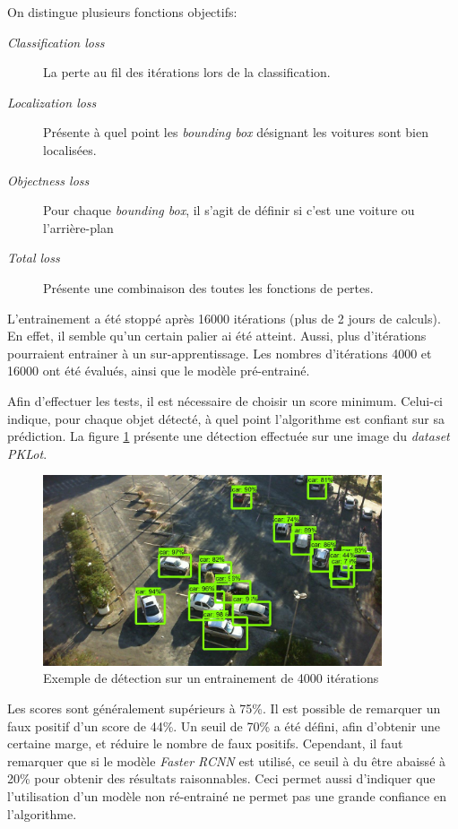 On distingue plusieurs fonctions objectifs:
\begin{description}
    \item[\textit{Classification loss}] La perte au fil des itérations lors de la classification. 
    \item[\textit{Localization loss}] Présente à quel point les \textit{bounding box} désignant les voitures sont bien localisées.
    \item[\textit{Objectness loss}] Pour chaque \textit{bounding box}, il s'agit de définir si c'est une voiture ou l'arrière-plan
    \item[\textit{Total loss}] Présente une combinaison des toutes les fonctions de pertes.
\end{description}

L'entrainement a été stoppé après 16000 itérations (plus de 2 jours de calculs). En effet, il semble qu'un certain palier ai été atteint. Aussi, plus d'itérations pourraient entrainer à un sur-apprentissage. Les nombres d'itérations 4000 et 16000 ont été évalués, ainsi que le modèle pré-entrainé.

Afin d'effectuer les tests, il est nécessaire de choisir un score minimum. Celui-ci indique, pour chaque objet détecté, à quel point l'algorithme est confiant sur sa prédiction. La figure \ref{fig:tensorflow_bb} présente une détection effectuée sur une image du \textit{dataset} \textit{PKLot}. 

\begin{figure}[ht]
    \includegraphics[width=10cm]{img/tests/tensorflow_bb.jpg}
    \centering
    \caption{Exemple de détection sur un entrainement de 4000 itérations}
    \label{fig:tensorflow_bb}
\end{figure} 

Les scores sont généralement supérieurs à 75\%. Il est possible de remarquer un faux positif d'un score de 44\%. Un seuil de 70\% a été défini, afin d'obtenir une certaine marge, et réduire le nombre de faux positifs. Cependant, il faut remarquer que si le modèle \textit{Faster RCNN} est utilisé, ce seuil à du être abaissé à 20\% pour obtenir des résultats raisonnables. Ceci permet aussi d'indiquer que l'utilisation d'un modèle non ré-entrainé ne permet pas une grande confiance en l'algorithme.

